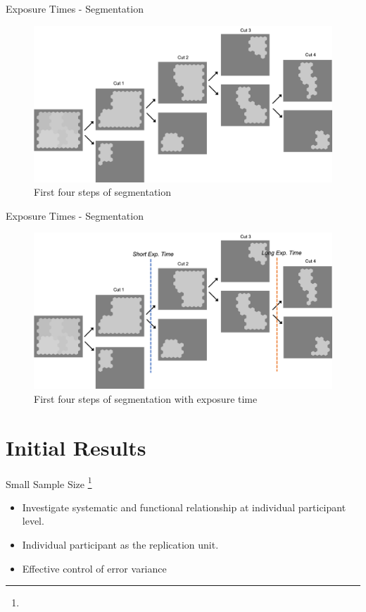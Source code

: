 \documentclass[10pt,xcolor=svgnames]{beamer} %
\begin{document}
\begin{frame}{Exposure Times - Segmentation}
\begin{figure}
    \centering
    \hspace*{-0.85cm} 
    \includegraphics[width=1.1\textwidth]{pictures/segmentation_example1.png}
    \caption{First four steps of segmentation}
    \label{fig:segmentationExample1}
\end{figure}
\end{frame}

\begin{frame}{Exposure Times - Segmentation}
\begin{figure}
    \centering
    \hspace*{-0.85cm} 
    \includegraphics[width=1.1\textwidth]{pictures/segmentation_example2.png}
    \caption{First four steps of segmentation with exposure time}
    \label{fig:segmentationExample1}
\end{figure}
\end{frame}


\section{Initial Results}
\begin{frame}{Small Sample Size \footnote{}}
    \begin{itemize}
        \item Investigate systematic and functional relationship at individual participant level.
        \item Individual participant as the replication unit.
        \item Effective control of error variance
    \end{itemize}
\end{frame}
\end{document}
